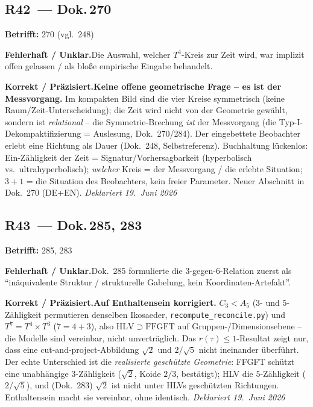 \medskip


\subsection*{R42~--- Dok.\,270}

\noindent\textbf{Betrifft:} 270 (vgl.\ 248)


\smallskip\noindent\textbf{Fehlerhaft / Unklar.}\quad Die Auswahl, welcher $T^4$-Kreis zur Zeit wird, war implizit offen gelassen / als bloße empirische Eingabe behandelt.


\smallskip\noindent\textbf{Korrekt / Präzisiert.}\quad \textbf{Keine offene geometrische Frage -- es ist der Messvorgang.} Im kompakten Bild sind die vier Kreise symmetrisch (keine Raum/Zeit-Unterscheidung); die Zeit wird nicht von der Geometrie gewählt, sondern ist \emph{relational} -- die Symmetrie-Brechung \emph{ist} der Messvorgang (die Typ-I-Dekompaktifizierung = Auslesung, Dok.~270/284). Der eingebettete Beobachter erlebt eine Richtung als Dauer (Dok.~248, Selbstreferenz). Buchhaltung lückenlos: Ein-Zähligkeit der Zeit = Signatur/Vorhersagbarkeit (hyperbolisch vs.\ ultrahyperbolisch); \emph{welcher} Kreis = der Messvorgang / die erlebte Situation; $3{+}1$ = die Situation des Beobachters, kein freier Parameter. Neuer Abschnitt in Dok.~270 (DE+EN). \emph{Deklariert 19.~Juni 2026}


\medskip


\subsection*{R43~--- Dok.\,285, 283}

\noindent\textbf{Betrifft:} 285, 283


\smallskip\noindent\textbf{Fehlerhaft / Unklar.}\quad Dok.~285 formulierte die $3$-gegen-$6$-Relation zuerst als ``inäquivalente Struktur / strukturelle Gabelung, kein Koordinaten-Artefakt''.


\smallskip\noindent\textbf{Korrekt / Präzisiert.}\quad \textbf{Auf Enthaltensein korrigiert.} $C_3<A_5$ ($3$- und $5$-Zähligkeit permutieren denselben Ikosaeder, \texttt{recompute\_reconcile.py}) und $T^7=T^4\times T^3$ ($7=4+3$), also $\mathrm{HLV}\supset\mathrm{FFGFT}$ auf Gruppen-/Dimensionsebene -- die Modelle sind vereinbar, nicht unverträglich. Das $r(\tau)\le1$-Resultat zeigt nur, dass eine cut-and-project-Abbildung $\sqrt2$ und $2/\sqrt5$ nicht ineinander überführt. Der echte Unterschied ist die \emph{realisierte geschützte Geometrie}: FFGFT schützt eine unabhängige $3$-Zähligkeit ($\sqrt2$, Koide $2/3$, bestätigt); HLV die $5$-Zähligkeit ($2/\sqrt5$), und (Dok.~283) $\sqrt2$ ist nicht unter HLVs geschützten Richtungen. Enthaltensein macht sie vereinbar, ohne identisch. \emph{Deklariert 19.~Juni 2026}


